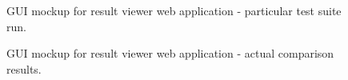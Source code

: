 \documentclass[11pt,oneside,final]{fithesis2}
\begin{document}
\begin{figure}[!htb]
    \begin{center}
    \leavevmode
    \centerline{}
    \end{center}
    \caption{GUI mockup for result viewer web application - particular test suite run.}
    \label{fig:particularRunMock}
\end{figure}

\begin{figure}[!htb]
    \begin{center}
    \leavevmode
    \centerline{}
    \end{center}
    \caption{GUI mockup for result viewer web application - actual comparison results.}
    \label{fig:comparisonResultMock}
\end{figure}
\end{document}
